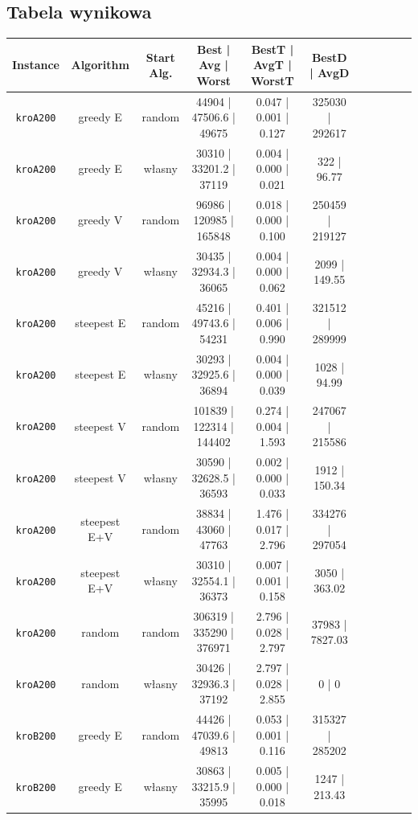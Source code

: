\documentclass[11pt]{article}
\begin{document}
\subsection{Tabela wynikowa}
\begin{table}[ht]
\centering
\begin{tabular}{|c|c|c||c|c|c||c|c|c||c|c|}
\hline
\textbf{Instance} & \textbf{Algorithm} & \textbf{Start Alg.} & \textbf{Best | Avg | Worst} & \textbf{BestT | AvgT | WorstT} & \textbf{BestD | AvgD} \\ \hline
\texttt{kroA200} & greedy E & random & 44904 | 47506.6 | 49675 & 0.047 | 0.001 | 0.127 & 325030 | 292617 \\ \hline
\texttt{kroA200} & greedy E & własny & 30310 | 33201.2 | 37119 & 0.004 | 0.000 | 0.021 & 322 | 96.77 \\ \hline
\texttt{kroA200} & greedy V & random & 96986 | 120985 | 165848 & 0.018 | 0.000 | 0.100 & 250459 | 219127 \\ \hline
\texttt{kroA200} & greedy V & własny & 30435 | 32934.3 | 36065 & 0.004 | 0.000 | 0.062 & 2099 | 149.55 \\ \hline
\texttt{kroA200} & steepest E & random & 45216 | 49743.6 | 54231 & 0.401 | 0.006 | 0.990 & 321512 | 289999 \\ \hline
\texttt{kroA200} & steepest E & własny & 30293 | 32925.6 | 36894 & 0.004 | 0.000 | 0.039 & 1028 | 94.99 \\ \hline
\texttt{kroA200} & steepest V & random & 101839 | 122314 | 144402 & 0.274 | 0.004 | 1.593 & 247067 | 215586 \\ \hline
\texttt{kroA200} & steepest V & własny & 30590 | 32628.5 | 36593 & 0.002 | 0.000 | 0.033 & 1912 | 150.34 \\ \hline
\texttt{kroA200} & steepest E+V & random & 38834 | 43060 | 47763 & 1.476 | 0.017 | 2.796 & 334276 | 297054 \\ \hline
\texttt{kroA200} & steepest E+V & własny & 30310 | 32554.1 | 36373 & 0.007 | 0.001 | 0.158 & 3050 | 363.02 \\ \hline
\texttt{kroA200} & random & random & 306319 | 335290 | 376971 & 2.796 | 0.028 | 2.797 & 37983 | 7827.03 \\ \hline
\texttt{kroA200} & random & własny & 30426 | 32936.3 | 37192 & 2.797 | 0.028 | 2.855 & 0 | 0 \\ \hline
\texttt{kroB200} & greedy E & random & 44426 | 47039.6 | 49813 & 0.053 | 0.001 | 0.116 & 315327 | 285202 \\ \hline
\texttt{kroB200} & greedy E & własny & 30863 | 33215.9 | 35995 & 0.005 | 0.000 | 0.018 & 1247 | 213.43 \\ \hline

\end{tabular}
\end{table}
\end{document}
